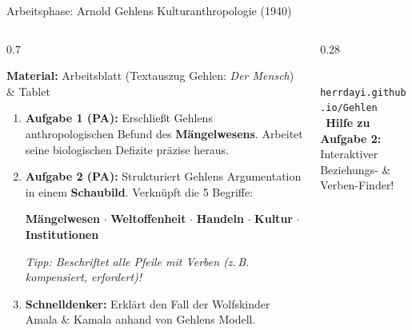 \documentclass[aspectratio=169, 10pt]{beamer}
\begin{document}
\begin{frame}{Arbeitsphase: Arnold Gehlens Kulturanthropologie (1940)}
    \vspace{-0.2cm}
    \begin{columns}[T]
        \begin{column}{0.7\textwidth}
            \begin{tcolorbox}[infoCard, title={\faTasks\ Arbeitsaufträge (Partnerarbeit · 30 Minuten)}]
                \footnotesize
                \textbf{Material:} Arbeitsblatt (Textauszug Gehlen: \textit{Der Mensch}) \& Tablet
                \begin{enumerate}\setlength{\itemsep}{4pt}
                    \item \textbf{Aufgabe 1 (PA):} Erschließt Gehlens anthropologischen Befund des \textbf{Mängelwesens}. Arbeitet seine biologischen Defizite präzise heraus.
                    \item \textbf{Aufgabe 2 (PA):} Strukturiert Gehlens Argumentation in einem \textbf{Schaubild}. Verknüpft die 5 Begriffe:
                    \begin{center}
                        \textbf{Mängelwesen} $\cdot$ \textbf{Weltoffenheit} $\cdot$ \textbf{Handeln} $\cdot$ \textbf{Kultur} $\cdot$ \textbf{Institutionen}
                    \end{center}
                    \textit{Tipp: Beschriftet alle Pfeile mit Verben (z.\,B. kompensiert, erfordert)!}
                    \item \textbf{Schnelldenker:} Erklärt den Fall der Wolfskinder Amala \& Kamala anhand von Gehlens Modell.
                \end{enumerate}
            \end{tcolorbox}
        \end{column}

        \begin{column}{0.28\textwidth}
            \centering
            \begin{tcolorbox}[enhanced, colframe=primaryBlue, colback=white, arc=3mm, boxrule=0.8pt, title={\faLaptopCode\ Lernumgebung}]
                \centering
                \\[0.15cm]
                \tiny\texttt{herrdayi.github.io/Gehlen}
                \\[0.1cm]
                \scriptsize\faLightbulb\ \textbf{Hilfe zu Aufgabe 2:}\\
                Interaktiver Beziehungs- \& Verben-Finder!
            \end{tcolorbox}
        \end{column}
    \end{columns}
\end{frame}
\end{document}
